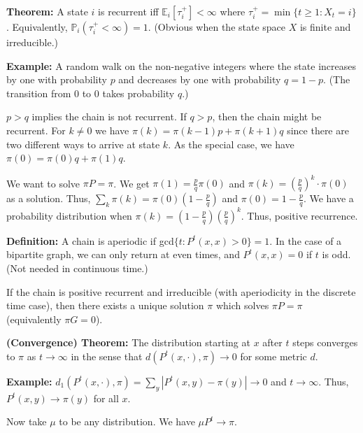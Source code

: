 \documentclass{article}
\newcommand{\I}{\infty}
\newcommand{\ta}{\tau}
\newcommand{\PP}{{\mathbb{P}}}
\newcommand{\EE}{{\mathbb{E}}}
\begin{document}
\vspace{5mm}
\textbf{Theorem:} A state $i$ is recurrent iff $\EE_i[\ta_{i}^+]<\I$ where $\ta_i^+=\min\{t\geq 1:X_t=i\}$.  Equivalently, $\PP_i(\ta_i^+<\I)=1$. (Obvious when the state space $X$ is finite and irreducible.)



\vspace{10mm}
\textbf{Example:} A random walk on the non-negative integers where the state increases by one with probability $p$ and decreases by one with probability $q=1-p$. (The transition from 0 to 0 takes probability $q$.) 

\vspace{5mm}
$p>q$ implies the chain is not recurrent. If $q>p$, then the chain might be recurrent. For $k\neq 0$ we have $\pi(k)=\pi(k-1)p+\pi(k+1)q$ since there are two different ways to arrive at state $k$. As the special case, we have $\pi(0)=\pi(0)q+\pi(1)q$. 

\vspace{5mm}
We want to solve $\pi P=\pi$. We get $\pi(1)=\frac{p}{q}\pi(0)$ and $\pi(k)=\left(\frac{p}{q}\right)^k\cdot\pi(0)$ as a solution. Thus, $\sum_k\pi(k)=\pi(0)\left(1-\frac{p}{q}\right)$ and $\pi(0)=1-\frac{p}{q}$. We have a probability distribution when $\pi(k)=\left(1-\frac{p}{q}\right)\left(\frac{p}{q}\right)^k$. Thus, positive recurrence.

\vspace{10mm}
\textbf{Definition:} A chain is aperiodic if gcd$\{t:P^t(x,x)>0\}=1$. In the case of a bipartite graph, we can only return at even times, and $P^t(x,x)=0$ if $t$ is odd. (Not needed in continuous time.)

\vspace{5mm}
If the chain is positive recurrent and irreducible (with aperiodicity in the discrete time case), then there exists a unique solution $\pi$ which solves $\pi P=\pi$ (equivalently $\pi G=0$).

\vspace{5mm}
\textbf{(Convergence) Theorem:} The distribution starting at $x$ after $t$ steps converges to $\pi$ as $t\to \I$ in the sense that $d(P^t(x,\cdot),\pi)\to 0$ for some metric $d$. 


\vspace{5mm}
\textbf{Example:} $d_1(P^t(x,\cdot),\pi)=\sum_y|P^t(x,y)-\pi(y)|\to 0$ and $t\to\I$. Thus, $P^t(x,y)\to\pi(y)$ for all $x$. 

\vspace{5mm}
Now take $\mu$ to be any distribution. We have $\mu P^t\to \pi$. 
\end{document}

